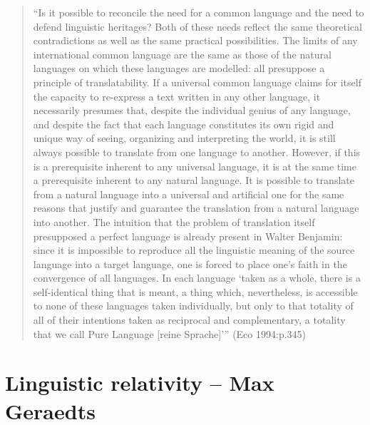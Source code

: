 \begin{quote}
\begin{singlespace}
“Is it possible to reconcile the need for a common language and the need to defend linguistic heritages? Both of these needs reflect the same theoretical contradictions as well as the same practical possibilities. The limits of any international common language are the same as those of the natural languages on which these languages are modelled: all presuppose a principle of translatability. If a universal common language claims for itself the capacity to re-express a text written in any other language, it necessarily presumes that, despite the individual genius of any language, and despite the fact that each language constitutes its own rigid and unique way of seeing, organizing and interpreting the world, it is still always possible to translate from one language to another. However, if this is a prerequisite inherent to any universal language, it is at the same time a prerequisite inherent to any natural language. It is possible to translate from a natural language into a universal and artificial one for the same reasons that justify and guarantee the translation from a natural language into another. The intuition that the problem of translation itself presupposed a perfect language is already present in Walter Benjamin: since it is impossible to reproduce all the linguistic meaning of the source language into a target language, one is forced to place one’s faith in the convergence of all languages. In each language ‘taken as a whole, there is a self-identical thing that is meant, a thing which, nevertheless, is accessible to none of these languages taken individually, but only to that totality of all of their intentions taken as reciprocal and complementary, a totality that we call Pure Language [reine Sprache]’” (Eco 1994:p.345)
 \end{singlespace}
\end{quote}

\section{Linguistic relativity -- {\small Max Geraedts}}

